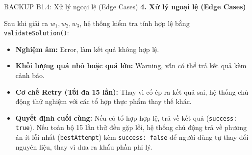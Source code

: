 \documentclass[10pt, aspectratio=169]{beamer}
\begin{document}
\begin{frame}[label=b1_4]{BACKUP B1.4: Xử lý ngoại lệ (Edge Cases)}
\hypertarget{b1_4_target}{}
    \textbf{4. Xử lý ngoại lệ (Edge Cases)}
    \vspace{0.2cm}
    
    Sau khi giải ra $w_1, w_2, w_3$, hệ thống kiểm tra tính hợp lệ bằng \texttt{validateSolution()}:
    
    \begin{itemize}
        \small
        \item \textbf{Nghiệm âm:} Error, làm kết quả không hợp lệ.
        \item \textbf{Khối lượng quá nhỏ hoặc quá lớn:} Warning, vẫn có thể trả kết quả kèm cảnh báo.
        \item \textbf{Cơ chế Retry (Tối đa 15 lần):} Thay vì cố ép ra kết quả sai, hệ thống chủ động thử nghiệm với các tổ hợp thực phẩm thay thế khác.
        \item \textbf{Quyết định cuối cùng:} Nếu có tổ hợp hợp lệ, trả về kết quả (\texttt{success: true}). Nếu toàn bộ 15 lần thử đều gặp lỗi, hệ thống chủ động trả về phương án ít lỗi nhất (\texttt{bestAttempt}) kèm \texttt{success: false} để người dùng tự thay đổi nguyên liệu, thay vì đưa ra khẩu phần phi lý.
    \end{itemize}
\end{frame}
\end{document}
